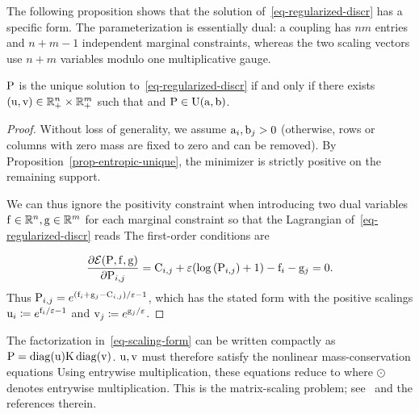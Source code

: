 The following proposition shows that the solution of~\eqref{eq-regularized-discr} has a specific form. The parameterization is essentially dual: a coupling has $nm$ entries and $n+m-1$ independent marginal constraints, whereas the two scaling vectors use $n+m$ variables modulo one multiplicative gauge.

\begin{prop}\label{prop-regularized-primal}
$\P$ is the unique solution to~\eqref{eq-regularized-discr} if and only if there exists $(\uD,\vD) \in \RR_+^n \times \RR_+^m$ such that
and $\P \in \CouplingsD(\a,\b)$.
\end{prop}

\begin{proof}
	Without loss of generality, we assume $\a_i,\b_j>0$ (otherwise, rows or columns with zero mass are fixed to zero and can be removed). By Proposition~\ref{prop-entropic-unique}, the minimizer is strictly positive on the remaining support.

	We can thus ignore the positivity constraint when introducing two dual variables $\fD\in\RR^n,\gD\in\RR^m$ for each marginal constraint so that the Lagrangian of~\eqref{eq-regularized-discr} reads
	The first-order conditions are

\[
		\frac{\partial\Lag(\P,\fD,\gD)}{\partial \P_{i,j}}= \C_{i,j} + \epsilon (\log\pa{ \P_{i,j} }+1) - \fD_i -\gD_j = 0.
\]
Thus
$\P_{i,j}=e^{(\fD_i+\gD_j-\C_{i,j})/\epsilon-1}$,
which has the stated form with the positive scalings
$\uD_i\eqdef e^{\fD_i/\epsilon-1}$ and $\vD_j\eqdef e^{\gD_j/\epsilon}$.
\end{proof}

The factorization in~\eqref{eq-scaling-form} can be written compactly as $\P=\diag(\uD)\K\diag(\vD)$.
%
$\uD,\vD$ must therefore satisfy the nonlinear mass-conservation equations
Using entrywise multiplication, these equations reduce to
\eql{\label{eq-dualsinkhorn-constraints2}
	\uD \odot (\K \vD) = \a
	\qandq
	\vD \odot (\transp{\K}\uD) = \b
}
where $\odot$ denotes entrywise multiplication. This is the matrix-scaling problem; see~\cite{nemirovski1999complexity} and the references therein.

